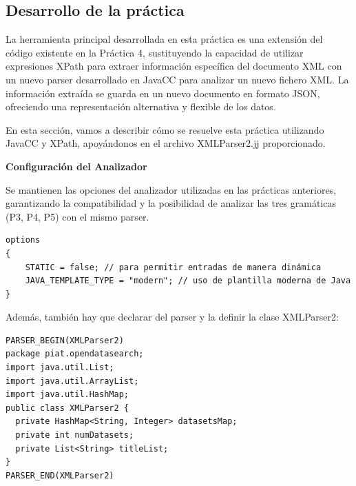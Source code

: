 
\subsection{Desarrollo de la práctica}

\noindent La herramienta principal desarrollada en esta práctica es una extensión del código existente en la Práctica 4, sustituyendo la capacidad de utilizar expresiones XPath para extraer información específica del documento XML con un nuevo parser desarrollado en JavaCC para analizar un nuevo fichero XML. La información extraída se guarda en un nuevo documento en formato JSON, ofreciendo una representación alternativa y flexible de los datos.

En esta sección, vamos a describir cómo se resuelve esta práctica utilizando JavaCC y XPath, apoyándonos en el archivo XMLParser2.jj proporcionado.

\phantom{text}

\noindent \textbf{Configuración del Analizador}

\phantom{text}

Se mantienen las opciones del analizador utilizadas en las prácticas anteriores, garantizando la compatibilidad y la posibilidad de analizar las tres gramáticas (P3, P4, P5) con el mismo parser.

\lstset{inputencoding=utf8/latin1}
\begin{lstlisting}
options
{
    STATIC = false; // para permitir entradas de manera dinámica
    JAVA_TEMPLATE_TYPE = "modern"; // uso de plantilla moderna de Java
}
\end{lstlisting}


Además, también hay que declarar del parser y la definir la clase XMLParser2:
\lstset{inputencoding=utf8/latin1}
\begin{lstlisting}
PARSER_BEGIN(XMLParser2)
package piat.opendatasearch;
import java.util.List;
import java.util.ArrayList;
import java.util.HashMap;
public class XMLParser2 {
  private HashMap<String, Integer> datasetsMap;
  private int numDatasets;
  private List<String> titleList;
}
PARSER_END(XMLParser2)
\end{lstlisting}

